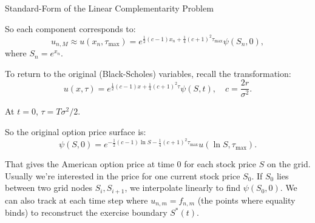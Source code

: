 \documentclass{beamer}
\begin{document}
\begin{frame}{Standard-Form of the Linear Complementarity Problem}

    {\footnotesize \footnotesize
     So each component corresponds to:
    \[
    u_{n, M} \approx u(x_n, \tau_{\max}) = e^{\frac{1}{2}(c-1)x_n + \frac{1}{4}(c+1)^2 \tau_{\max}} \psi(S_n, 0),
    \]
    where $S_n = e^{x_n}$.

        To return to the original (Black-Scholes) variables, recall the transformation:
    \[
    u(x, \tau) = e^{\frac{1}{2}(c-1)x + \frac{1}{4}(c+1)^2 \tau} \psi(S, t), \quad c = \frac{2r}{\sigma^2}.
    \]

    At $t = 0$, $\tau = T\sigma^2 / 2$.

     \pause So the original option price surface is:
    \[
    \psi(S, 0) = e^{-\frac{1}{2}(c-1)\ln S - \frac{1}{4}(c+1)^2 \tau_{\max}} u(\ln S, \tau_{\max}).
    \]

    That gives the American option price at time 0 for each stock price $S$ on the grid.
    Usually we're interested in the price for one current stock price $S_0$. If $S_0$ 
    lies between two grid nodes $S_i, S_{i+1}$, we interpolate linearly to find $\psi(S_0, 0)$.
    We can also track at each time step where $u_{n,m} = f_{n,m}$ (the points where equality binds) to
     reconstruct the exercise boundary $S^*(t)$.
    }
\end{frame}
\end{document}
